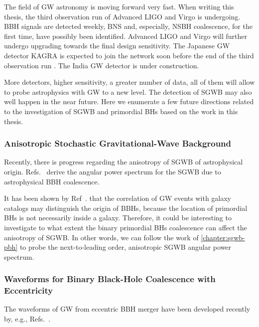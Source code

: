 The field of \ac{GW} astronomy is moving forward very fast.
When writing this thesis, the third observation run of Advanced LIGO and Virgo is undergoing.
\ac{BBH} signals are detected weekly, \ac{BNS} and, especially,  \acl{NSBH} coalescence, for the first time, have possibly been identified.
Advanced LIGO and Virgo will further undergo upgrading towards the final design sensitivity.
The Japanese \ac{GW} detector KAGRA is expected to join the network soon before the end of the third observation run \cite{livingreviewligo}.
The India \ac{GW} detector is under construction.

More detectors, higher sensitivity, a greater number of data, all of them will allow to probe astrophysics with \ac{GW} to a new level.
The detection of \ac{SGWB} may also well happen in the near future.
Here we enumerate a few future directions related to the investigation of \ac{SGWB} and primordial \acp{BH} based on the work in this thesis.

\subsubsection{Anisotropic Stochastic Gravitational-Wave Background}

Recently, there is progress regarding the anisotropy of \ac{SGWB} of astrophysical origin.
Refs.~\cite{SGWBaniso1,SGWBaniso2,SGWBaniso3} derive the angular power spectrum for the \ac{SGWB} due to astrophysical \ac{BBH} coalescence. 

It has been shown by Ref~.\cite{Raccanelli:2016cud} that the correlation of \ac{GW} events with galaxy catalogs may distinguish the origin of \acp{BBH}, because the location of primordial \acp{BH} is not necessarily inside a galaxy.
Therefore, it could be interesting to investigate to what extent the binary primordial \acp{BH} coalescence can affect the anisotropy of \ac{SGWB}.
In other words, we can follow the work of \cref{chapter:sgwb-pbh} to probe the next-to-leading order, anisotropic \ac{SGWB} angular power spectrum.

\subsubsection {Waveforms for Binary Black-Hole Coalescence with Eccentricity}

The waveforms of \ac{GW} from eccentric \ac{BBH} merger have been developed recently by, e.g., Refs.~\cite{eccentric1,eccentric2,eccentric3,eccentric4,eccentric5,eccentric6,eccentric7}.

